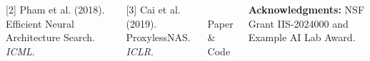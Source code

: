 \documentclass[25pt, a0paper, portrait, margin=15mm,
    innermargin=15mm, blockverticalspace=12mm, colspace=20mm]{tikzposter}
\begin{document}
\begin{columns}
{{        [2] Pham et al. (2018). Efficient Neural Architecture Search. \textit{ICML}.

        [3] Cai et al. (2019). ProxylessNAS. \textit{ICLR}.
        }

        \vspace{1em}
        \begin{center}
        \\[0.5em]
        {\normalsize Paper \& Code}
        \end{center}

        \vspace{0.5em}
        {\small \textbf{Acknowledgments:} NSF Grant IIS-2024000 and Example AI Lab Award.}
    }

\end{columns}
\end{document}
